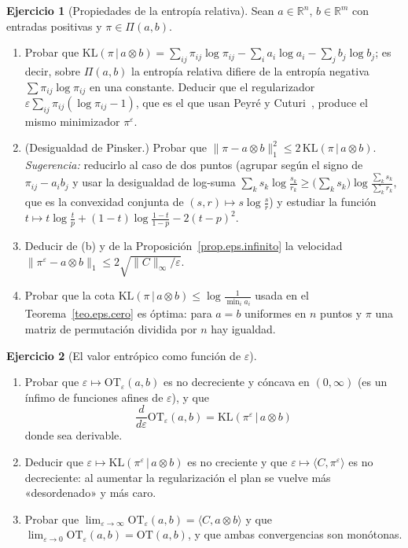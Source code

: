 \documentclass[12pt, a4paper]{amsbook}
\newcommand{\ve}{\varepsilon}
\newcommand{\R}{{\mathbb R}}
\theoremstyle{remark}
\theoremstyle{definition}
\newtheorem{ejercicio}{Ejercicio}[chapter]
\numberwithin{section}{chapter}
\numberwithin{subsection}{section}
\numberwithin{equation}{section}
\numberwithin{figure}{chapter}
\begin{document}
\begin{ejercicio}[Propiedades de la entropía relativa]\label{ejer.KL.propiedades}
Sean $a\in\R^n$, $b\in\R^m$ con entradas positivas y $\pi\in\Pi(a,b)$.
\begin{enumerate}[label=(\alph*)]
\item Probar que $\mathrm{KL}(\pi\,|\,a\otimes b)=\sum_{ij}\pi_{ij}\log\pi_{ij}-\sum_ia_i\log a_i-\sum_jb_j\log b_j$;
es decir, sobre $\Pi(a,b)$ la entropía relativa difiere de la entropía
negativa $\sum\pi_{ij}\log\pi_{ij}$ en una constante. Deducir que el
regularizador $\ve\sum_{ij}\pi_{ij}(\log\pi_{ij}-1)$, que es el que usan
Peyré y Cuturi~\cite{PeyreCuturi2019}, produce el mismo minimizador
$\pi^\ve$.
\item (Desigualdad de Pinsker.) Probar que
$\|\pi-a\otimes b\|_1^2\le2\,\mathrm{KL}(\pi\,|\,a\otimes b)$.
\emph{Sugerencia:} reducirlo al caso de dos puntos (agrupar según el signo
de $\pi_{ij}-a_ib_j$ y usar la desigualdad de log-suma
$\sum_ks_k\log\frac{s_k}{r_k}\ge\bigl(\sum_ks_k\bigr)\log\frac{\sum_ks_k}{\sum_kr_k}$,
que es la convexidad conjunta de $(s,r)\mapsto s\log\frac sr$) y estudiar la
función $t\mapsto t\log\frac tp+(1-t)\log\frac{1-t}{1-p}-2(t-p)^2$.
\item Deducir de (b) y de la Proposición~\ref{prop.eps.infinito} la
velocidad $\|\pi^\ve-a\otimes b\|_1\le2\sqrt{\|C\|_\infty/\ve}$.
\item Probar que la cota $\mathrm{KL}(\pi\,|\,a\otimes b)\le\log\frac1{\min_ia_i}$
usada en el Teorema~\ref{teo.eps.cero} es óptima: para $a=b$ uniformes en
$n$ puntos y $\pi$ una matriz de permutación dividida por $n$ hay igualdad.
\end{enumerate}
\end{ejercicio}

\begin{ejercicio}[El valor entrópico como función de $\ve$]\label{ejer.OTeps.concavo}
\leavevmode
\begin{enumerate}[label=(\alph*)]
\item Probar que $\ve\mapsto\mathrm{OT}_\ve(a,b)$ es no decreciente y cóncava
en $(0,\infty)$ (es un ínfimo de funciones afines de $\ve$), y que
\[
\frac{d}{d\ve}\mathrm{OT}_\ve(a,b)=\mathrm{KL}(\pi^\ve\,|\,a\otimes b)
\]
donde sea derivable.
\item Deducir que $\ve\mapsto\mathrm{KL}(\pi^\ve\,|\,a\otimes b)$ es no
creciente y que $\ve\mapsto\langle C,\pi^\ve\rangle$ es no decreciente:
al aumentar la regularización el plan se vuelve más «desordenado» y más
caro.
\item Probar que $\lim_{\ve\to\infty}\mathrm{OT}_\ve(a,b)=\langle C,a\otimes b\rangle$
y que $\lim_{\ve\to0}\mathrm{OT}_\ve(a,b)=\mathrm{OT}(a,b)$, y que ambas
convergencias son monótonas.
\end{enumerate}
\end{ejercicio}
\end{document}
